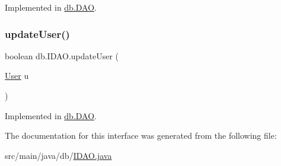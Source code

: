 Implemented in \hyperlink{classdb_1_1_d_a_o_ab73940ac7600902ea7d52bcd041a9c6e}{db.\+D\+AO}.

\mbox{\label{interfacedb_1_1_i_d_a_o_adbc5f00b7bcdffb6692367a3c9564193}} 
\subsubsection{\texorpdfstring{update\+User()}{updateUser()}}
{\footnotesize\ttfamily boolean db.\+I\+D\+A\+O.\+update\+User (\begin{DoxyParamCaption}\item[{\hyperlink{classserver_1_1data_1_1_user}{User}}]{u }\end{DoxyParamCaption})}



Implemented in \hyperlink{classdb_1_1_d_a_o_a5cd4462deb77065c2d12471cd73b3ec8}{db.\+D\+AO}.



The documentation for this interface was generated from the following file\+:\begin{DoxyCompactItemize}
\item 
src/main/java/db/\hyperlink{_i_d_a_o_8java}{I\+D\+A\+O.\+java}\end{DoxyCompactItemize}
